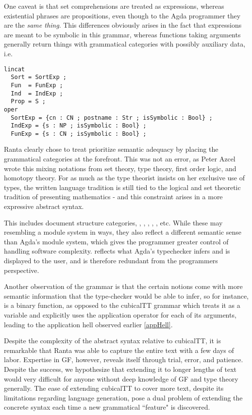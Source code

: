 One caveat is that set comprehensions are treated as expressions, whereas
existential phrases are propositions, even though to the Agda programmer they
are the \emph{same thing}. This differences obviously arises in the fact
that expressions are meant to be symbolic in this grammar, whereas functions
taking  arguments generally return things with grammatical categories
with possibly auxiliary data, i.e.

\begin{verbatim}
lincat
  Sort = SortExp ;
  Fun  = FunExp ;
  Ind  = IndExp ; 
  Prop = S ;
oper
  SortExp = {cn : CN ; postname : Str ; isSymbolic : Bool} ;
  IndExp = {s : NP ; isSymbolic : Bool} ;
  FunExp = {s : CN ; isSymbolic : Bool} ;
\end{verbatim}

Ranta clearly chose to treat prioritize semantic adequacy by placing the
grammatical categories at the forefront. This was not an error, as Peter Azcel
wrote this mixing notations from set theory, type theory, first order logic, and
homotopy theory. For as much as the type theorist insists on her
exclusive use of types, the written language tradition is still tied to the
logical and set theoretic tradition of presenting mathematics - and this
constraint arises in a more expressive abstract syntax.

This includes document structure categories, , ,
, , , etc. While
these may resembling a module system in ways, they also reflect a different
semantic sense than Agda's module system, which gives the programmer greater
control of handling software complexity.  reflects
what Agda's typechecker infers and is displayed to the user, and is therefore
redundant from the programmers perspective.

Another observation of the grammar is that the certain notions come with more
semantic information that the type-checker would be able to infer, so for
instance, \codewrod {} is a binary function, as opposed to the
cubicalTT grammar which treats it as a variable and explicitly uses the
application operator for each of its arguments, leading to the application hell 
observed earlier \ref{appHell}.

Despite the complexity of the abstract syntax relative to cubicalTT, it is
remarkable that Ranta was able to capture the entire text with a few days of
labor. Expertise in GF, however, reveals itself through trial, error, and
patience. Despite the success, we hypothesize that extending it to longer
lengths of text would very difficult for anyone without deep knowledge of GF and
type theory generally. The ease of extending cubicalTT to cover more text,
despite its limitations regarding language generation, pose a dual problem of
extending the concrete syntax each time a new grammatical ``feature" is discovered.

